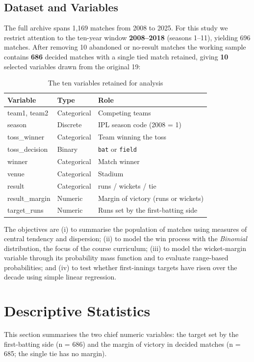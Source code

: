 \documentclass[11pt,a4paper]{article}
\begin{document}
\subsection{Dataset and Variables}
The full archive spans 1{,}169 matches from 2008 to 2025. For this study we
restrict attention to the ten-year window \textbf{2008--2018} (seasons 1--11),
yielding 696 matches. After removing 10 abandoned or no-result matches the
working sample contains \textbf{686} decided matches with a single tied match
retained, giving \textbf{10} selected variables drawn from the original 19:

\begin{table}[h!]
\centering
\caption{The ten variables retained for analysis}
\begin{tabular}{lll}
\toprule
\textbf{Variable} & \textbf{Type} & \textbf{Role} \\
\midrule
team1, team2            & Categorical & Competing teams \\
season                  & Discrete     & IPL season code (2008 = 1)\\ 
toss\_winner            & Categorical & Team winning the toss \\
toss\_decision          & Binary       & {\tt bat} or {\tt field} \\
winner                  & Categorical & Match winner \\
venue                   & Categorical & Stadium \\
result                  & Categorical & runs / wickets / tie \\
result\_margin          & Numeric      & Margin of victory (runs or wickets) \\
target\_runs            & Numeric      & Runs set by the first-batting side \\
\bottomrule
\end{tabular}
\end{table}

The objectives are (i) to summarise the population of matches using measures of
central tendency and dispersion; (ii) to model the win process with the
\emph{Binomial} distribution, the focus of the course curriculum; (iii) to model
the wicket-margin variable through its probability mass function and to evaluate
range-based probabilities; and (iv) to test whether first-innings targets have
risen over the decade using simple linear regression.

\section{Descriptive Statistics}
This section summarises the two chief numeric variables: the target set by the
first-batting side (n = 686) and the margin of victory in decided matches
(n = 685; the single tie has no margin).
\end{document}
